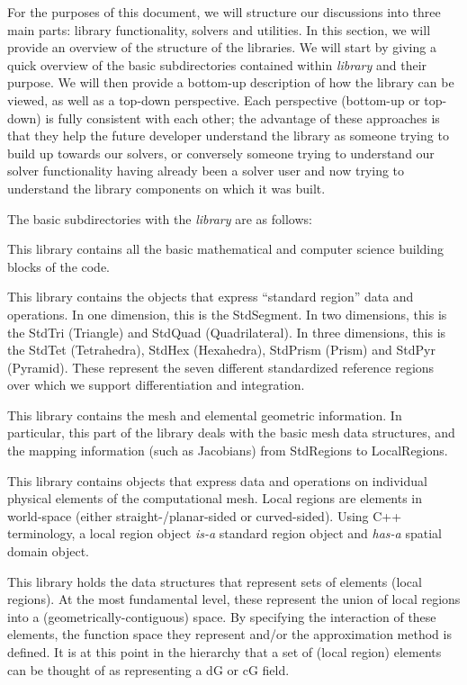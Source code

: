 For the purposes of this document, we will structure our discussions into three main parts:  library functionality, solvers and utilities.  In this
section, we will provide an overview of the structure of the libraries.  We will start by giving a quick overview of the basic subdirectories
contained within {\em library} and their purpose.  We will then provide a bottom-up description of how the library can be viewed, as well
as a top-down perspective.  Each perspective (bottom-up or top-down) is fully consistent with each other; the advantage of these approaches
is that they help the future developer understand the library as someone trying to build up towards our solvers, or conversely someone trying
to understand our solver functionality having already been a solver user and now trying to understand the library components on which it was built.

The basic subdirectories with the {\em library} are as follows:

  This library contains all the basic mathematical and computer science building blocks of the {\nek} code.

 This library contains the objects that express ``standard region'' data and operations.  In one dimension, this is the StdSegment.  In two 
dimensions, this is the StdTri (Triangle) and StdQuad (Quadrilateral).  In three dimensions, this is the StdTet (Tetrahedra), 
StdHex (Hexahedra), StdPrism (Prism) and StdPyr (Pyramid).  These represent the seven different standardized reference regions over which 
we support differentiation and integration. 

 This library contains the mesh and elemental geometric information.  In particular, this part of the library deals with the basic mesh 
data structures, and the mapping information (such as Jacobians) from StdRegions to LocalRegions.

  This library contains objects that express data and operations on individual physical elements of the computational mesh.  Local regions are \shp{} elements in
world-space (either straight-/planar-sided or curved-sided).  Using C++ terminology, a local region object {\em is-a} standard region object and {\em has-a} spatial domain object.

 This library holds the data structures that represent sets of elements (local regions).  At the most fundamental 
level, these represent the union of local regions into a (geometrically-contiguous) space.  By specifying the interaction of these elements, the function space they represent and/or the approximation method is defined.  It is at this point in the hierarchy that a set of (local region) elements can be thought of as representing a dG or cG field.

